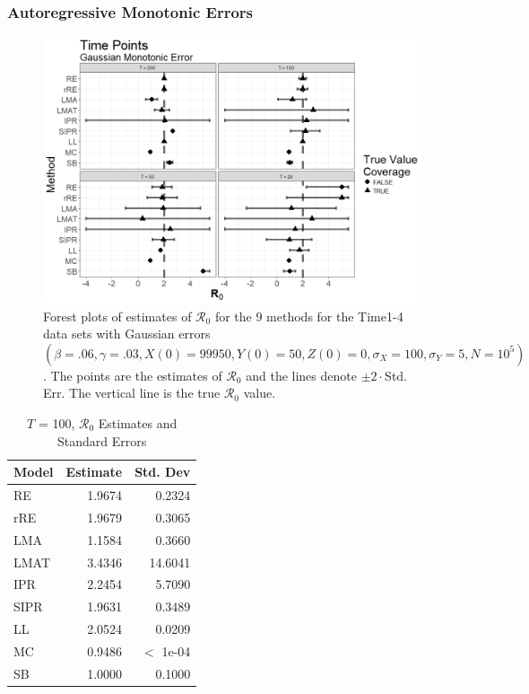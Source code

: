 \documentclass[12pt]{article}
\newcommand{\xxsir}{\ensuremath{9} } %
\newcommand{\rr}{\ensuremath{\mathcal{R}_0}}
\begin{document}
\subsubsection{Autoregressive Monotonic Errors}
\begin{figure}[H]
	\centering
	\includegraphics[scale=0.5]{images/time_arm.jpeg}
	\caption{Forest plots of estimates of $\rr$ for the \xxsir methods for the Time1-4 data sets with Gaussian errors $(\beta=.06, \gamma=.03, X(0)=99950, Y(0)=50, Z(0)=0, \sigma_X=100, \sigma_Y=5, N=10^5)$.  The points are the estimates of $\rr$ and the lines denote $\pm 2\cdot $Std. Err.  The vertical line is the true $\rr$ value.}
\end{figure}

\begin{table}[H]
	
	
	\centering
	\begin{tabular}[t]{l|r|r}
		\hline
		Model & Estimate & Std. Dev\\
		\hline
		RE & 1.9674 & 0.2324\\
		\hline
		rRE & 1.9679 & 0.3065\\
		\hline
		LMA & 1.1584 & 0.3660\\
		\hline
		LMAT & 3.4346 & 14.6041\\
		\hline
		IPR & 2.2454 & 5.7090\\
		\hline
		SIPR & 1.9631 & 0.3489\\
		\hline
		LL & 2.0524 & 0.0209\\
		\hline
		MC & 0.9486 & $<$ 1e-04\\
		\hline
		SB & 1.0000 & 0.1000\\
		\hline
	\end{tabular}
	\caption{ $T$ = 100, $\rr$ Estimates and Standard Errors}
\end{table}
\end{document}

